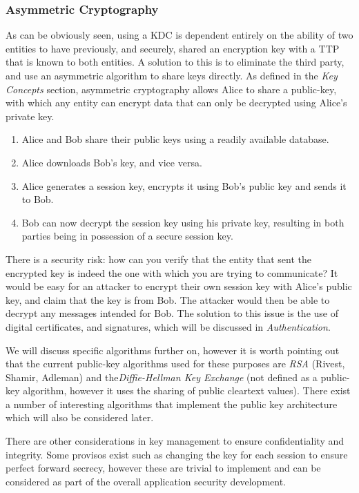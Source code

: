 \subsubsection{Asymmetric Cryptography}

As can be obviously seen, using a KDC is dependent entirely on the ability of two entities to have previously, and securely, shared an encryption key with a TTP that is known to both entities. A solution to this is to eliminate the third party, and use an asymmetric algorithm to share keys directly. As defined in the \emph{Key Concepts} section, asymmetric cryptography allows Alice to share a public-key, with which any entity can encrypt data that can only be decrypted using Alice's private key.

\begin{enumerate}
	\item Alice and Bob share their public keys using a readily available database.
	\item Alice downloads Bob's key, and vice versa.
	\item Alice generates a session key, encrypts it using Bob's public key and sends it to Bob.
	\item Bob can now decrypt the session key using his private key, resulting in both parties being in possession of a secure session key.
\end{enumerate}

There is a security risk: how can you verify that the entity that sent the encrypted key is indeed the one with which you are trying to communicate? It would be easy for an attacker to encrypt their own session key with Alice's public key, and claim that the key is from Bob. The attacker would then be able to decrypt any messages intended for Bob. The solution to this issue is the use of digital certificates, and signatures, which will be discussed in \emph{Authentication}.

We will discuss specific algorithms further on, however it is worth pointing out that the current public-key algorithms used for these purposes are \emph{RSA} (Rivest, Shamir, Adleman) and the\emph{Diffie-Hellman Key Exchange} (not defined as a public-key algorithm, however it uses the sharing of public cleartext values). There exist a number of interesting algorithms that implement the public key architecture which will also be considered later.

There are other considerations in key management to ensure confidentiality and integrity. Some provisos exist such as changing the key for each session to ensure perfect forward secrecy, however these are trivial to implement and can be considered as part of the overall application security development.

